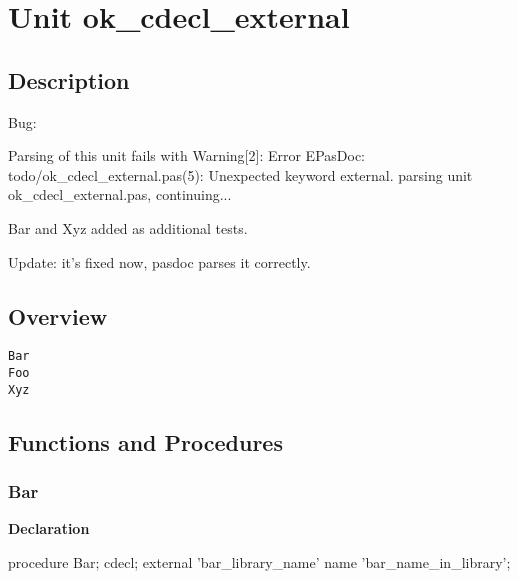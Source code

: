 \documentclass{report}
\newif\ifpdf
\begin{document}
\label{toc}\tableofcontents
\newpage
\newlength{\tmplength}
\chapter{Unit ok{\_}cdecl{\_}external}
\label{ok_cdecl_external}
\section{Description}
Bug:

Parsing of this unit fails with Warning[2]: Error EPasDoc: todo/ok{\_}cdecl{\_}external.pas(5): Unexpected keyword external. parsing unit ok{\_}cdecl{\_}external.pas, continuing...

Bar and Xyz added as additional tests.

Update: it's fixed now, pasdoc parses it correctly.
\section{Overview}
\begin{description}
\item[\texttt{Bar}]
\item[\texttt{Foo}]
\item[\texttt{Xyz}]
\end{description}
\section{Functions and Procedures}
\ifpdf
\subsection*{\large{\textbf{Bar}}\normalsize\hspace{1ex}\hrulefill}
\else
\subsection*{Bar}
\fi
\label{ok_cdecl_external-Bar}
\begin{list}{}{
\setlength{\itemindent}{0cm}
\setlength{\listparindent}{0cm}
\setlength{\leftmargin}{\evensidemargin}
\addtolength{\leftmargin}{\tmplength}
\settowidth{\labelsep}{X}
\addtolength{\leftmargin}{\labelsep}
\setlength{\labelwidth}{\tmplength}
}
\item[\textbf{Declaration}\hfill]
\ifpdf
\begin{flushleft}
\fi
\begin{ttfamily}
procedure Bar; cdecl; external 'bar{\_}library{\_}name' name 'bar{\_}name{\_}in{\_}library';\end{ttfamily}

\ifpdf
\end{flushleft}
\fi

\end{list}
\ifpdf
\end{document}
